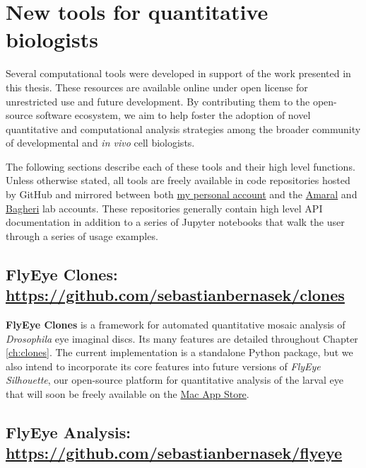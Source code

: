 \section{New tools for quantitative biologists}
\label{appendix:resources:software}

Several computational tools were developed in support of the work presented in this thesis. These resources are available online under open license for unrestricted use and future development. By contributing them to the open-source software ecosystem, we aim to help foster the adoption of novel quantitative and computational analysis strategies among the broader community of developmental and \textit{in vivo} cell biologists. 

The following sections describe each of these tools and their high level functions. Unless otherwise stated, all tools are freely available in code repositories hosted by GitHub and mirrored between both \href{https://github.com/sebastianbernasek/}{my personal account} and the \href{https://github.com/amarallab}{Amaral} and \href{https://github.com/bagherilab}{Bagheri} lab accounts. These repositories generally contain high level API documentation in addition to a series of Jupyter notebooks that walk the user through a series of usage examples. 

\subsection{\textbf{FlyEye Clones}: \url{https://github.com/sebastianbernasek/clones}}
\label{appendix:resources:clones}

\textbf{FlyEye Clones} is a framework for automated quantitative mosaic analysis of \textit{Drosophila} eye imaginal discs. Its many features are detailed throughout Chapter \ref{ch:clones}. The current implementation is a standalone Python package, but we also intend to incorporate its core features into future versions of \emph{FlyEye Silhouette}, our open-source platform for quantitative analysis of the larval eye that will soon be freely available on the \href{https://www.apple.com/ca/osx/apps/app-store/}{Mac App Store}. 

\subsection{\textbf{FlyEye Analysis}: \url{https://github.com/sebastianbernasek/flyeye}}
\label{appendix:resources:flyeye}

